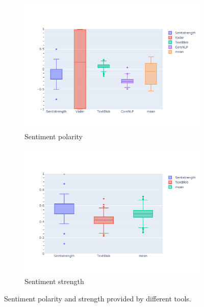 \begin{figure}[!htbp]
     \centering
     \begin{subfigure}[b]{\textwidth}
         \centering
         \includegraphics[trim={0 1.5cm 0 2cm},clip,width=\textwidth]{figures/sentiment_polarity_comparison.pdf}
         \caption{Sentiment polarity}
         \label{fig:sentiment_polarity_comparison}
     \end{subfigure}
     \begin{subfigure}[b]{\textwidth}
         \centering
         \includegraphics[trim={0 1.5cm 0 2cm},clip,width=\textwidth]{figures/sentiment_strength_comparison.pdf}
         \caption{Sentiment strength}
         \label{fig:sentiment_strength_comparison}
     \end{subfigure}
        \caption{Sentiment polarity and strength provided by different tools.}
        \label{fig:sentiment_axes_comparison}
\end{figure}

